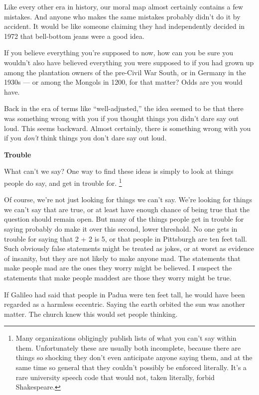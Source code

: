 \documentclass[12pt]{book}
\begin{document}
Like every other era in history, our moral map almost certainly contains
a few mistakes. And anyone who makes the same mistakes probably didn't
do it by accident. It would be like someone claiming they had
independently decided in 1972 that bell-bottom jeans were a good idea.

If you believe everything you're supposed to now, how can you be sure
you wouldn't also have believed everything you were supposed to if you
had grown up among the plantation owners of the pre-Civil War South, or
in Germany in the 1930s --- or among the Mongols in 1200, for that
matter? Odds are you would have.

Back in the era of terms like ``well-adjusted,'' the idea seemed to be
that there was something wrong with you if you thought things you didn't
dare say out loud. This seems backward. Almost certainly, there is
something wrong with you if you \emph{don't} think things you don't dare
say out loud.

\textbf{Trouble}

What can't we say? One way to find these ideas is simply to look at
things people do say, and get in trouble for. \footnote{Many organizations obligingly publish lists of what you can't
say within them. Unfortunately these are usually both incomplete,
because there are things so shocking they don't even anticipate anyone
saying them, and at the same time so general that they couldn't possibly
be enforced literally. It's a rare university speech code that would
not, taken literally, forbid Shakespeare.}

Of course, we're not just looking for things we can't say. We're looking
for things we can't say that are true, or at least have enough chance of
being true that the question should remain open. But many of the things
people get in trouble for saying probably do make it over this second,
lower threshold. No one gets in trouble for saying that 2 + 2 is 5, or
that people in Pittsburgh are ten feet tall. Such obviously false
statements might be treated as jokes, or at worst as evidence of
insanity, but they are not likely to make anyone mad. The statements
that make people mad are the ones they worry might be believed. I
suspect the statements that make people maddest are those they worry
might be true.

If Galileo had said that people in Padua were ten feet tall, he would
have been regarded as a harmless eccentric. Saying the earth orbited the
sun was another matter. The church knew this would set people thinking.
\end{document}
